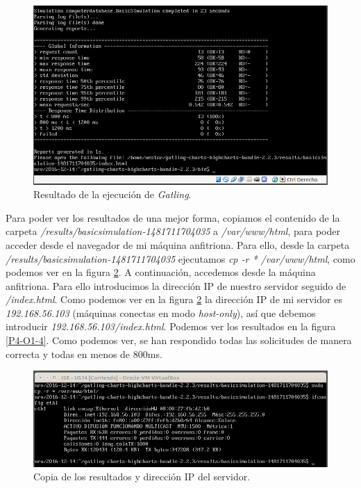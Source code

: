 \documentclass[a4paper,titlepage,12pt]{report}	%
\numberwithin{figure}{section} %
\numberwithin{table}{section} %
\begin{document}
	\begin{figure}[H]
		\includegraphics[width=\linewidth]{./Imagenes/P4/O1-2.png}
		\vspace{-0.5cm}
		\caption[Resultado de la ejecución de \textit{Gatling}.]{Resultado de la ejecución de \textit{Gatling}.}
		\label{P4-O1-2}
	\end{figure}
	
	Para poder ver los resultados de una mejor forma, copiamos el contenido de la carpeta \textit{/results/basicsimulation-1481711704035} a \textit{/var/www/html}, para poder acceder desde el navegador de mi máquina anfitriona. Para ello, desde la carpeta \textit{/results/basicsimulation-1481711704035} ejecutamos \textit{cp -r * /var/www/html}, como podemos ver en la figura \ref{P4-O1-3}. A continuación, accedemos desde la máquina anfitriona. Para ello introducimos la dirección IP de nuestro servidor seguido de \textit{/index.html}. Como podemos ver en la figura \ref{P4-O1-3} la dirección IP de mi servidor es \textit{192.168.56.103} (máquinas conectas en modo \textit{host-only}), así que debemos introducir \textit{192.168.56.103/index.html}. Podemos ver los resultados en la figura \ref{P4-O1-4}. Como podemos ver, se han respondido todas las solicitudes de manera correcta y todas en menos de 800ms. 
	
	\begin{figure}[H]
		\includegraphics[width=\linewidth]{./Imagenes/P4/O1-3.png}
		\vspace{-0.5cm}
		\caption[Copia de los resultados y dirección IP del servidor.]{Copia de los resultados y dirección IP del servidor.}
		\label{P4-O1-3}
	\end{figure}
	
\end{document}
